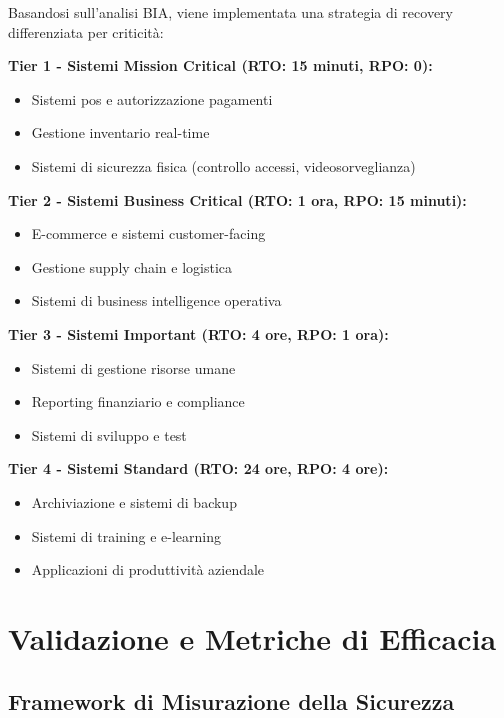 Basandosi sull'analisi BIA, viene implementata una strategia di recovery differenziata per criticità:

\textbf{Tier 1 - Sistemi Mission Critical (RTO: 15 minuti, RPO: 0):}
\begin{itemize}
\item Sistemi \gls{pos} e autorizzazione pagamenti
\item Gestione inventario real-time
\item Sistemi di sicurezza fisica (controllo accessi, videosorveglianza)
\end{itemize}

\textbf{Tier 2 - Sistemi Business Critical (RTO: 1 ora, RPO: 15 minuti):}
\begin{itemize}
\item E-commerce e sistemi customer-facing
\item Gestione supply chain e logistica
\item Sistemi di business intelligence operativa
\end{itemize}

\textbf{Tier 3 - Sistemi Important (RTO: 4 ore, RPO: 1 ora):}
\begin{itemize}
\item Sistemi di gestione risorse umane
\item Reporting finanziario e compliance
\item Sistemi di sviluppo e test
\end{itemize}

\textbf{Tier 4 - Sistemi Standard (RTO: 24 ore, RPO: 4 ore):}
\begin{itemize}
\item Archiviazione e sistemi di backup
\item Sistemi di training e e-learning
\item Applicazioni di produttività aziendale
\end{itemize}

\section{\texorpdfstring{Validazione e Metriche di Efficacia}{2.6 - Validazione e Metriche di Efficacia}}
\label{sec:2.6_validazione}

\subsection{\texorpdfstring{Framework di Misurazione della Sicurezza}{2.6.1 - Framework di Misurazione della Sicurezza}}
\label{subsec:2.6.1_framework_misurazione}

